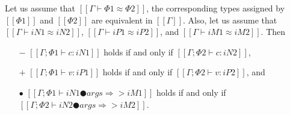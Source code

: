 \begin{property}
  Let us assume that $[[Γ ⊢ Φ1 ≈ Φ2]]$, \ie  
  the corresponding types assigned by $[[Φ1]]$ and
  $[[Φ2]]$ are equivalent in $[[Γ]]$.
  Also, let us assume that 
  $[[Γ ⊢ iN1 ≈ iN2]]$, $[[Γ ⊢ iP1 ≈ iP2]]$,
  and $[[Γ ⊢ iM1 ≈ iM2]]$. Then
  \begin{itemize}
    \item [$-$] $[[Γ ; Φ1 ⊢ c : iN1]]$ holds if and only if $[[Γ ; Φ2 ⊢ c : iN2]]$,
    \item [$+$] $[[Γ ; Φ1 ⊢ v : iP1]]$ holds if and only if $[[Γ ; Φ2 ⊢ v : iP2]]$, and
    \item [$\bullet$] $[[Γ; Φ1 ⊢ iN1 ● args ⇒> iM1]]$ holds if and only if $[[Γ; Φ2 ⊢ iN2 ● args ⇒> iM2]]$.
  \end{itemize}
\end{property}



